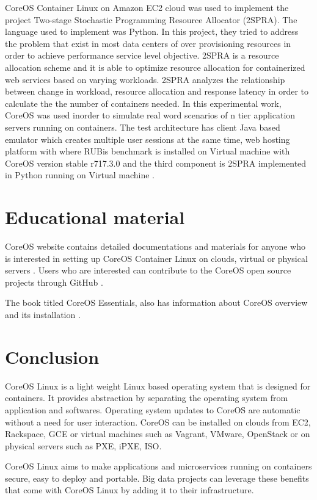 \documentclass[9pt,twocolumn,twoside]{../../styles/osajnl}
\begin{document}
CoreOS Container Linux on Amazon EC2 cloud was used to implement the
project Two-stage Stochastic Programming Resource Allocator
(2SPRA). The language used to implement was Python. In this
project, they tried to address the problem that exist in most data
centers of over provisioning resources in order to achieve performance
service level objective. 2SPRA is a resource allocation scheme and it
is able to optimize resource allocation for containerized web services
based on varying workloads. 2SPRA analyzes the relationship between
change in workload, resource allocation and response latency in order
to calculate the the number of containers needed. In this experimental
work, CoreOS was used inorder to simulate real word scenarios of n
tier application servers running on containers. The test architecture
has client Java based emulator which creates multiple user sessions at
the same time, web hosting platform with where RUBis benchmark is
installed on Virtual machine with CoreOS version stable r717.3.0 and
the third component is 2SPRA implemented in Python running on Virtual
machine \cite{2SPRA}.


\section{Educational material} 

CoreOS website contains detailed documentations and materials for
anyone who is interested in setting up CoreOS Container Linux on
clouds, virtual or physical servers \cite{www-coreOSquickstart}.
Users who are interested can contribute to the CoreOS open source
projects through GitHub \cite {www-coregit}.

The book titled CoreOS Essentials, also has information about CoreOS
overview and its installation \cite{coreOSBook}.

\section{Conclusion} 
CoreOS Linux is a light weight Linux based operating system that is
designed for containers. It provides abstraction by separating the
operating system from application and softwares. Operating system
updates to CoreOS are automatic without a need for user
interaction. CoreOS can be installed on clouds from EC2, Rackspace,
GCE or virtual machines such as Vagrant, VMware, OpenStack or on
physical servers such as PXE, iPXE, ISO.  

CoreOS Linux aims to make applications and microservices running on
containers secure, easy to deploy and portable. Big data projects can
leverage these benefits that come with CoreOS Linux by adding it to
their infrastructure.
\end{document}
